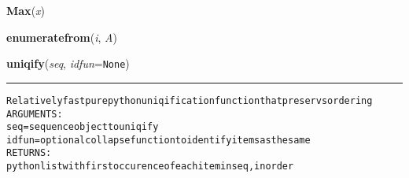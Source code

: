     \vspace{0.5ex}

\hspace{.8\funcindent}\begin{boxedminipage}{\funcwidth}

    \raggedright \textbf{Max}(\textit{x})

\setlength{\parskip}{2ex}
\setlength{\parskip}{1ex}
    \end{boxedminipage}

    \label{System:Utils:enumeratefrom}

    \vspace{0.5ex}

\hspace{.8\funcindent}\begin{boxedminipage}{\funcwidth}

    \raggedright \textbf{enumeratefrom}(\textit{i}, \textit{A})

\setlength{\parskip}{2ex}
\setlength{\parskip}{1ex}
    \end{boxedminipage}

    \label{System:Utils:uniqify}

    \vspace{0.5ex}

\hspace{.8\funcindent}\begin{boxedminipage}{\funcwidth}

    \raggedright \textbf{uniqify}(\textit{seq}, \textit{idfun}={\tt None})

    \vspace{-1.5ex}

    \rule{\textwidth}{0.5\fboxrule}
\setlength{\parskip}{2ex}
\begin{alltt}

Relatively fast pure python uniqification function that preservs ordering
ARGUMENTS:
        seq = sequence object to uniqify
        idfun = optional collapse function to identify items as the same
RETURNS:
        python list with first occurence of each item in seq, in order
\end{alltt}

\setlength{\parskip}{1ex}
    \end{boxedminipage}

    \label{System:Utils:FastArrayUniqify}

